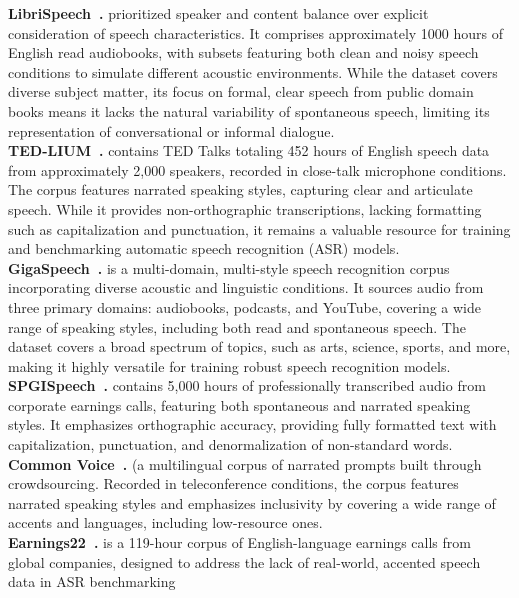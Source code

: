 \noindent\textbf{LibriSpeech~\cite{panayotov2015librispeech}.} prioritized speaker and content balance over explicit consideration of speech characteristics. It comprises approximately 1000 hours of English read audiobooks, with subsets featuring both clean and noisy speech conditions to simulate different acoustic environments. While the dataset covers diverse subject matter, its focus on formal, clear speech from public domain books means it lacks the natural variability of spontaneous speech, limiting its representation of conversational or informal dialogue.  \\
\noindent\textbf{TED-LIUM~\cite{rousseau2014tedlium}.} contains TED Talks totaling 452 hours of English speech data from approximately 2,000 speakers, recorded in close-talk microphone conditions. The corpus features narrated speaking styles, capturing clear and articulate speech. While it provides non-orthographic transcriptions, lacking formatting such as capitalization and punctuation, it remains a valuable resource for training and benchmarking automatic speech recognition (ASR) models.\\
\noindent\textbf{GigaSpeech~\cite{chen2021gigaspeech}.} is a multi-domain, multi-style speech recognition corpus incorporating diverse acoustic and linguistic conditions. It sources audio from three primary domains: audiobooks, podcasts, and YouTube, covering a wide range of speaking styles, including both read and spontaneous speech. The dataset covers a broad spectrum of topics, such as arts, science, sports, and more, making it highly versatile for training robust speech recognition models. \\
\noindent\textbf{SPGISpeech~\cite{kensho2021spgispeech}.} contains 5,000 hours of professionally transcribed audio from corporate earnings calls, featuring both spontaneous and narrated speaking styles. It emphasizes orthographic accuracy, providing fully formatted text with capitalization, punctuation, and denormalization of non-standard words. \\
\noindent\textbf{Common Voice~\cite{ardila2020common}.} (a multilingual corpus of narrated prompts built through crowdsourcing. Recorded in teleconference conditions, the corpus features narrated speaking styles and emphasizes inclusivity by covering a wide range of accents and languages, including low-resource ones. \\
\noindent\textbf{Earnings22~\cite{rio2022earnings}.} is a 119-hour corpus of English-language earnings calls from global companies, designed to address the lack of real-world, accented speech data in ASR benchmarking\\

